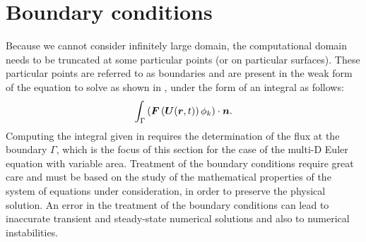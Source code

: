 \section{Boundary conditions} \label{sec:bc}
Because we cannot consider infinitely large domain, the computational domain needs to be truncated at some particular points (or on particular surfaces). These particular points are referred to as boundaries and are present in the weak form of the equation to solve as shown in , under the form of an integral as follows:
%
\begin{equation}\label{eq:hyp_weak_bc_sct3}
\int_\Gamma \left( \boldsymbol F \left( \boldsymbol U(\boldsymbol r, t) \right) \phi_k \right) \cdot \boldsymbol n.
\end{equation}
%
Computing the integral given in  requires the determination of the flux at the boundary $\Gamma$, which is the focus of this section for the case of the multi-D Euler equation with variable area. Treatment of the boundary conditions require great care and must be based on the study of the mathematical properties of the system of equations under consideration, in order to preserve the physical solution. An error in the treatment of the boundary conditions can lead to inaccurate transient and steady-state numerical solutions and also to numerical instabilities.

